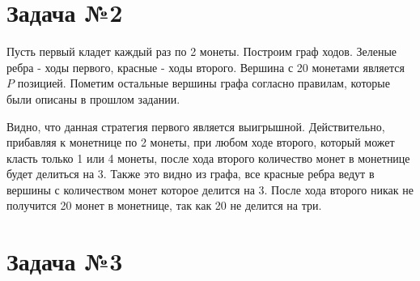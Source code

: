 \documentclass{article}
\begin{document}
\section*{Задача №2}

Пусть первый кладет каждый раз по 2 монеты. Построим граф ходов. Зеленые ребра - ходы первого, красные - ходы второго. Вершина с 20 монетами является $P$ позицией. Пометим остальные вершины графа согласно правилам, которые были описаны в прошлом задании.

\begin{figure}[!ht]
\end{figure}

\newpage

Видно, что данная стратегия первого является выигрышной. Действительно, прибавляя к монетнице по 2 монеты, при любом ходе второго, который может класть только 1 или 4 монеты, после хода второго количество монет в монетнице будет делиться на 3. Также это видно из графа, все красные ребра ведут в вершины с количеством монет которое делится на 3. После хода второго никак не получится 20 монет в монетнице, так как 20 не делится на три.

\section*{Задача №3}
\end{document}
